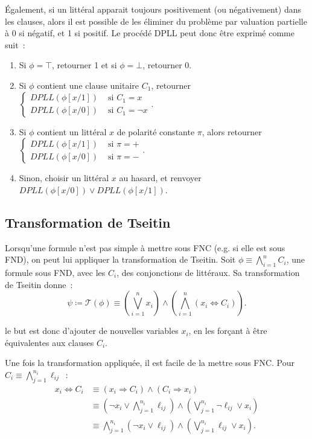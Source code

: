 \documentclass{article}
\theoremstyle{definition}
\theoremstyle{remark}
\begin{document}
	Également, si un littéral apparait toujours positivement (ou négativement) dans les clauses, alors il est possible de les éliminer du problème par valuation
	partielle à 0 si négatif, et 1 si positif. Le procédé DPLL peut donc être exprimé comme suit~:
	\begin{enumerate}
		\item Si $\phi = \top$, retourner 1 et si $\phi = \bot$, retourner 0.
		\item Si $\phi$ contient une clause unitaire $C_1$, retourner
			$\begin{cases}DPLL(\phi[x/1]) &\text{ si } C_1 = x \\DPLL(\phi[x/0]) &\text{ si } C_1 = \lnot x\end{cases}$.
		\item Si $\phi$ contient un littéral $x$ de polarité constante $\pi$, alors retourner
			$\begin{cases}DPLL(\phi[x/1]) &\text{ si } \pi=+\\DPLL(\phi[x/0]) &\text{ si } \pi=-\end{cases}$.
			\item Sinon, choisir un littéral $x$ au hasard, et renvoyer $DPLL(\phi[x/0]) \lor DPLL(\phi[x/1])$.
	\end{enumerate}

	\subsection{Transformation de Tseitin}
		Lorsqu'une formule n'est pas simple à mettre sous FNC (e.g. si elle est sous FND), on peut lui appliquer la transformation de Tseitin.
		Soit $\phi \equiv \bigwedge_{i=1}^nC_i$, une formule sous FND, avec les $C_i$, des conjonctions de littéraux. Sa transformation de Tseitin
		donne~:
		\[\psi \coloneqq \mathscr T(\phi) \equiv \left(\bigvee_{i=1}^nx_i\right) \land \left(\bigwedge_{i=1}^n\left(x_i \Leftrightarrow C_i\right)\right).\]

		le but est donc d'ajouter de nouvelles variables $x_i$, en les forçant à être équivalentes aux clauses $C_i$.

		Une fois la transformation appliquée, il est facile de la mettre sous FNC. Pour $C_i \equiv \bigwedge_{j=1}^{n_i}\ell_{ij}$~:
		\begin{align*}
			x_i \Leftrightarrow C_i &\equiv (x_i \Rightarrow C_i) \land (C_i \Rightarrow x_i) \\
			&\equiv \left(\lnot x_i \lor \bigwedge_{j=1}^{n_i}\ell_{ij}\right) \land \left(\bigvee_{j=1}^{n_i}\lnot \ell_{ij} \lor x_i\right) \\
			&\equiv \bigwedge_{j=1}^{n_i}(\lnot x_i \lor \ell_{ij}) \land \left(\bigvee_{j=1}^{n_i}\ell_{ij} \lor x_i\right).
		\end{align*}
\end{document}
